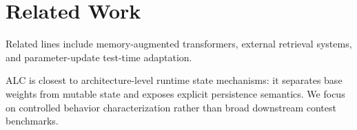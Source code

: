 \section{Related Work}
Related lines include memory-augmented transformers, external retrieval systems, and parameter-update test-time adaptation.

ALC is closest to architecture-level runtime state mechanisms: it separates base weights from mutable state and exposes explicit persistence semantics. We focus on controlled behavior characterization rather than broad downstream contest benchmarks.
